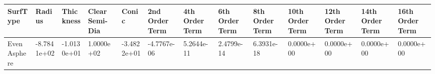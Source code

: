 \documentclass[convert={convertexe={magick.exe}}]{standalone}
\begin{document}
\begin{tabular}{lllllllllllll}
\toprule
    SurfType &      Radius &   Thickness &  Clear Semi-Dia &       Conic &  2nd Order Term &  4th Order Term &  6th Order Term &  8th Order Term &  10th Order Term &  12th Order Term &  14th Order Term &  16th Order Term \\
\midrule
Even Asphere & -8.7841e+02 & -1.0130e+01 &      1.0000e+02 & -3.4822e+01 &     -4.7767e-06 &      5.2644e-11 &      2.4799e-14 &      6.3931e-18 &       0.0000e+00 &       0.0000e+00 &       0.0000e+00 &       0.0000e+00 \\
\bottomrule
\end{tabular}
\end{document}
